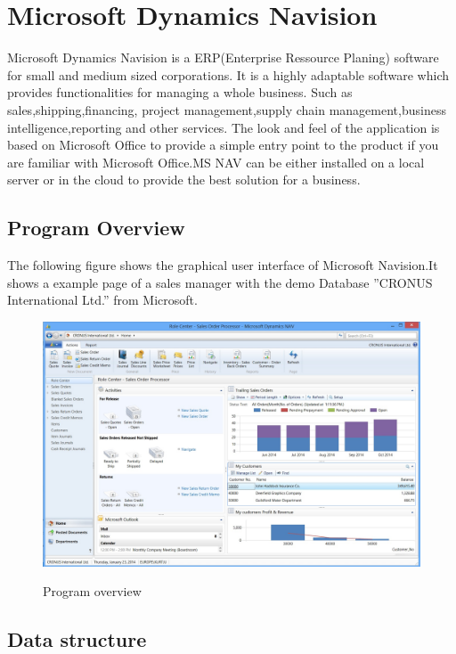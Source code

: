 \section{Microsoft Dynamics Navision}
Microsoft Dynamics Navision is a ERP(Enterprise Ressource Planing) software for small and medium sized corporations. It is a highly adaptable software which provides functionalities for managing a whole business. Such as sales,shipping,financing, project management,supply chain management,business intelligence,reporting and other services. 
The look and feel of the application is based on Microsoft Office to provide a simple entry point to the product if you are familiar with Microsoft Office.MS NAV can be either installed on a local server or in the cloud to provide the best solution for a business.\cite{navOver} 

\subsection{Program Overview}
The following figure shows the graphical user interface of Microsoft Navision.It shows a example page of a sales manager with the demo Database ''CRONUS International Ltd.'' from Microsoft.
\begin{figure}[htbp]
\centering
\includegraphics[width=\textwidth,height=\textheight,keepaspectratio]{graphics/navSales.jpg}
\caption{Program overview}\cite{azureOver}
\end{figure}
\newpage

\subsection{Data structure}
